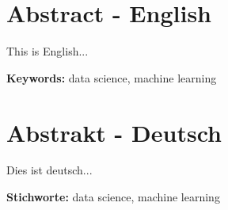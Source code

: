 \section*{Abstract - English}

This is English...

\textbf{Keywords:} data science, machine learning

\section*{Abstrakt - Deutsch}

Dies ist deutsch...

\textbf{Stichworte:} data science, machine learning
